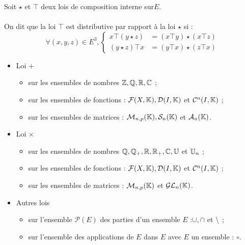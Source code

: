 \begin{defprop}[Distributivité]
    Soit \(\star\) et \(\top\) deux lois de composition interne sur\( E\).\\~\\
    On dit que la loi \(\top\) est distributive par rapport à la loi \(\star\) si :
    \[\forall (x, y, z) \in E^3, \begin{cases}
    x\top (y \star z) &= (x\top y) \star (x\top z)\\
    (y \star z) \top x &= (y\top x) \star (z\top x)
    \end{cases} \]
\end{defprop}

\begin{defprop}
    \begin{itemize}
        \item Loi \(+\)
        \begin{itemize}
            \item sur les ensembles de nombres \(\mathbb{Z}, \mathbb{Q}, \mathbb{R}, \mathbb{C}\) ;
            \item sur les ensembles de fonctions : \(\mathcal{F}(X, \mathbb{K}), \mathcal{D} (I, \mathbb{K})\) et \(\mathcal{C}^n (I, \mathbb{K})\) ;
            \item sur les ensembles de matrices : \(\mathcal{M}_{n,p} (\mathbb{K}), \mathcal{S}_n (\mathbb{K})\) et \(\mathcal{A}_n (\mathbb{K})\).
        \end{itemize}
        \item Loi \(\times\)
        \begin{itemize}
            \item sur les ensembles de nombres \(\mathbb{Q}, \mathbb{Q}_+, \mathbb{R}, \mathbb{R}_+, \mathbb{C}, \mathbb{U}\) et \(\mathbb{U}_n\) ;
            \item sur les ensembles de fonctions : \(\mathcal{F}(X, \mathbb{K}), \mathcal{D} (I, \mathbb{K})\) et \(\mathcal{C}^n (I, \mathbb{K})\) ;
            \item sur les ensembles de matrices : \(\mathcal{M}_{n,p} (\mathbb{K})\) et \(\mathcal{GL}_n (\mathbb{K})\).
        \end{itemize}
        \item Autres lois 
        \begin{itemize}
            \item sur l’ensemble \(\mathcal{P}(E)\) des parties d’un ensemble \(E\) :\( \cup, \cap\) et \(\backslash\) ;
            \item sur l’ensemble des applications de \(E\) dans \(E\) avec \(E\) un ensemble : \(\circ\).
        \end{itemize}
    \end{itemize}
\end{defprop}

